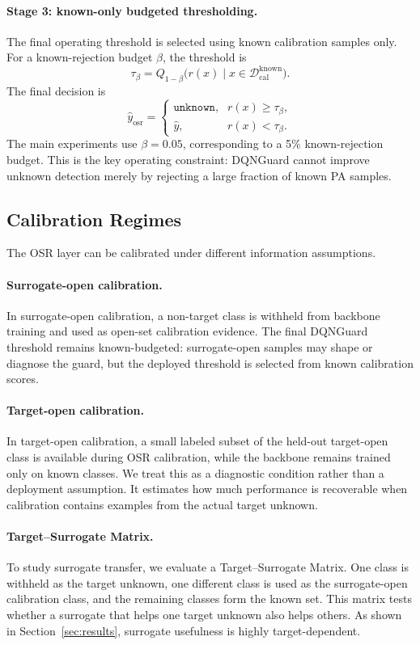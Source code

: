 \paragraph{Stage 3: known-only budgeted thresholding.}
The final operating threshold is selected using known calibration samples only. For a known-rejection budget $\beta$, the threshold is
\begin{equation}
    \tau_{\beta} =
    Q_{1-\beta}\bigl(r(x) \mid x \in \mathcal{D}_{\mathrm{cal}}^{\mathrm{known}}\bigr).
\end{equation}
The final decision is
\begin{equation}
\hat{y}_{\mathrm{osr}} =
\begin{cases}
\texttt{unknown}, & r(x) \geq \tau_{\beta},\\
\hat{y}, & r(x) < \tau_{\beta}.
\end{cases}
\label{eq:dqnguard_decision}
\end{equation}
The main experiments use $\beta=0.05$, corresponding to a 5\% known-rejection budget. This is the key operating constraint: DQNGuard cannot improve unknown detection merely by rejecting a large fraction of known PA samples.

\subsection{Calibration Regimes}
\label{subsec:method_calibration_modes}

The OSR layer can be calibrated under different information assumptions.

\paragraph{Surrogate-open calibration.}
In surrogate-open calibration, a non-target class is withheld from backbone training and used as open-set calibration evidence. The final DQNGuard threshold remains known-budgeted: surrogate-open samples may shape or diagnose the guard, but the deployed threshold is selected from known calibration scores.

\paragraph{Target-open calibration.}
In target-open calibration, a small labeled subset of the held-out target-open class is available during OSR calibration, while the backbone remains trained only on known classes. We treat this as a diagnostic condition rather than a deployment assumption. It estimates how much performance is recoverable when calibration contains examples from the actual target unknown.

\paragraph{Target--Surrogate Matrix.}
To study surrogate transfer, we evaluate a Target--Surrogate Matrix. One class is withheld as the target unknown, one different class is used as the surrogate-open calibration class, and the remaining classes form the known set. This matrix tests whether a surrogate that helps one target unknown also helps others. As shown in Section~\ref{sec:results}, surrogate usefulness is highly target-dependent.
